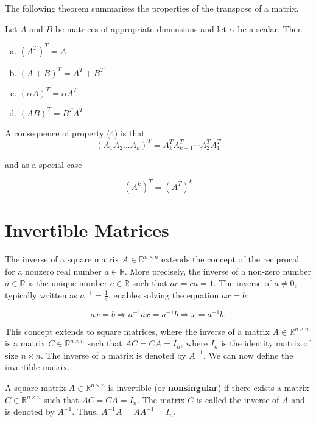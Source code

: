 The following theorem summarises the properties of the transpose of a matrix.

\begin{theorem}
    Let $A$ and $B$ be matrices of appropriate dimensions and let $\alpha$ be a scalar. Then
    \begin{enumerate}[(a)]
        \item $(A^T)^T = A$
        \item $(A + B)^T = A^T + B^T$
        \item $(\alpha A)^T = \alpha A^T$
        \item $(AB)^T = B^T A^T$
    \end{enumerate}
\end{theorem}

A consequence of property (4) is that
\[
\left(A_1 A_2 \ldots A_k\right)^T=A_k^T A_{k-1}^T \cdots A_2^T A_1^T
\]

and as a special case

\[
\left(A^k\right)^T=\left(A^T\right)^k
\]

\section{Invertible Matrices}
The inverse of a square matrix \( A \in \mathbb{R}^{n \times n} \) extends the concept of the reciprocal for a nonzero real number \( a \in \mathbb{R} \). More precisely, the inverse of a non-zero number \( a \in \mathbb{R} \) is the unique number \( c \in \mathbb{R} \) such that \( a c = c a = 1 \). The inverse of \( a \neq 0 \), typically written as \( a^{-1} = \frac{1}{a} \), enables solving the equation \( a x = b \):

\[
a x = b \Rightarrow a^{-1} a x = a^{-1} b \Rightarrow x = a^{-1} b.
\]

This concept extends to square matrices, where the inverse of a matrix \( A \in \mathbb{R}^{n \times n} \) is a matrix \( C \in \mathbb{R}^{n \times n} \) such that \( A C = C A = I_n \), where \( I_n \) is the identity matrix of size \( n \times n \). The inverse of a matrix is denoted by \( A^{-1} \). We can now define the invertible matrix.

\begin{definition}
    A square matrix \( A \in \mathbb{R}^{n \times n} \) is invertible (or \textbf{nonsingular}) if there exists a matrix \( C \in \mathbb{R}^{n \times n} \) such that \( A C = C A = I_n \). The matrix \( C \) is called the inverse of \( A \) and is denoted by \( A^{-1} \). Thus, \( A^{-1} A = A A^{-1} = I_n \).
\end{definition}

